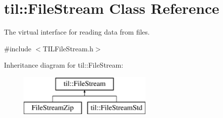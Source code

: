 \hypertarget{classtil_1_1_file_stream}{
\section{til::FileStream Class Reference}
\label{classtil_1_1_file_stream}
}


The virtual interface for reading data from files.  




{\ttfamily \#include $<$TILFileStream.h$>$}

Inheritance diagram for til::FileStream:\begin{figure}[H]
\begin{center}
\leavevmode
\includegraphics[height=2.000000cm]{classtil_1_1_file_stream}
\end{center}
\end{figure}
